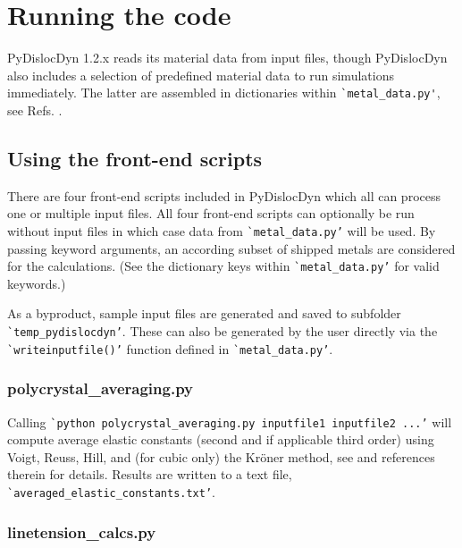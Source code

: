 \documentclass[11pt,letterpaper,oneside,pdftex]{article}
\begin{document}
\section{Running the code}

PyDislocDyn 1.2.x reads its material data from input files, though PyDislocDyn also includes a selection of predefined material data to run simulations immediately.
The latter are assembled in dictionaries within \verb|`metal_data.py'|, see Refs. \cite{Hertzberg:2012,Kaye:2004,CRCHandbook,Wasserbaech:1990,Seeger:1960,Graham:1968,Smith:1966,Epstein:1965,Lowrie:1967,Thomas:1968,Hiki:1966,Leese:1968,Voronov:1978,Alers:1960,Saunders:1986,Powell:1984,Naimon:1971,Riley:1973,Swartz:1972,Rao:1973,Swartz:1970,Singh:1992}.

\subsection{Using the front-end scripts}
\label{sec:frontends}

There are four front-end scripts included in PyDislocDyn which all can process one or multiple input files.
All four front-end scripts can optionally be run without input files in which case data from \verb|`metal_data.py’| will be used.
By passing keyword arguments, an according subset of shipped metals are considered for the calculations.
(See the dictionary keys within \verb|`metal_data.py’| for valid keywords.)

As a byproduct, sample input files are generated and saved to subfolder \verb|`temp_pydislocdyn’|.
These can also be generated by the user directly via the \verb|`writeinputfile()’| function defined in \verb|`metal_data.py’|.


\subsubsection{polycrystal\_averaging.py}

Calling \verb|`python polycrystal_averaging.py inputfile1 inputfile2 ...’| will compute average elastic constants (second and if applicable third order) using Voigt, Reuss, Hill, and (for cubic only) the Kr{\"o}ner method, see \cite{Blaschke:2017Poly} and references therein for details.
Results are written to a text file,
\\\verb|`averaged_elastic_constants.txt’|.



\subsubsection{linetension\_calcs.py}
\end{document}
